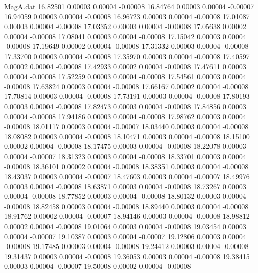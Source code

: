 \begin{filecontents}{MagA.dat}
  16.82501    0.00003    0.00004   -0.00008
  16.84764    0.00003    0.00004   -0.00007
  16.94059    0.00003    0.00004   -0.00008
  16.96723    0.00003    0.00004   -0.00008
  17.01087    0.00003    0.00004   -0.00008
  17.03352    0.00003    0.00004   -0.00008
  17.05638    0.00002    0.00004   -0.00008
  17.08041    0.00003    0.00004   -0.00008
  17.15042    0.00003    0.00004   -0.00008
  17.19649    0.00002    0.00004   -0.00008
  17.31332    0.00003    0.00004   -0.00008
  17.33700    0.00003    0.00004   -0.00008
  17.35970    0.00003    0.00004   -0.00008
  17.40597    0.00002    0.00004   -0.00008
  17.42933    0.00002    0.00004   -0.00008
  17.47611    0.00003    0.00004   -0.00008
  17.52259    0.00003    0.00004   -0.00008
  17.54561    0.00003    0.00004   -0.00008
  17.63824    0.00003    0.00004   -0.00008
  17.66167    0.00002    0.00004   -0.00008
  17.70814    0.00003    0.00004   -0.00008
  17.73191    0.00003    0.00004   -0.00008
  17.80193    0.00003    0.00004   -0.00008
  17.82473    0.00003    0.00004   -0.00008
  17.84856    0.00003    0.00004   -0.00008
  17.94186    0.00003    0.00004   -0.00008
  17.98762    0.00003    0.00004   -0.00008
  18.01117    0.00003    0.00004   -0.00007
  18.03440    0.00003    0.00004   -0.00008
  18.08082    0.00003    0.00004   -0.00008
  18.10471    0.00003    0.00004   -0.00008
  18.15100    0.00002    0.00004   -0.00008
  18.17475    0.00003    0.00004   -0.00008
  18.22078    0.00003    0.00004   -0.00007
  18.31323    0.00003    0.00004   -0.00008
  18.33701    0.00003    0.00004   -0.00008
  18.36101    0.00002    0.00004   -0.00008
  18.38351    0.00003    0.00004   -0.00008
  18.43037    0.00003    0.00004   -0.00007
  18.47603    0.00003    0.00004   -0.00007
  18.49976    0.00003    0.00004   -0.00008
  18.63871    0.00003    0.00004   -0.00008
  18.73267    0.00003    0.00004   -0.00008
  18.77852    0.00003    0.00004   -0.00008
  18.80132    0.00003    0.00004   -0.00008
  18.82458    0.00003    0.00004   -0.00008
  18.89440    0.00003    0.00004   -0.00008
  18.91762    0.00002    0.00004   -0.00007
  18.94146    0.00003    0.00004   -0.00008
  18.98812    0.00002    0.00004   -0.00008
  19.01064    0.00003    0.00004   -0.00008
  19.03454    0.00003    0.00004   -0.00007
  19.10387    0.00003    0.00004   -0.00007
  19.12806    0.00003    0.00004   -0.00008
  19.17485    0.00003    0.00004   -0.00008
  19.24412    0.00003    0.00004   -0.00008
  19.31437    0.00003    0.00004   -0.00008
  19.36053    0.00003    0.00004   -0.00008
  19.38415    0.00003    0.00004   -0.00007
  19.50008    0.00002    0.00004   -0.00008

\end{filecontents}
